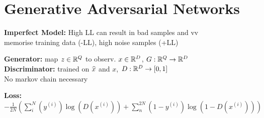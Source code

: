 \section{Generative Adversarial Networks}
\textbf{Imperfect Model:} High LL can result in bad samples and vv\\
memorise training data (-LL), high noise samples (+LL)\\

\textbf{Generator:} map $z \in \mathbb{R}^Q$ to observ. $x \in \mathbb{R}^D$, $G: \mathbb{R}^Q \rightarrow \mathbb{R}^D$\\
\textbf{Discriminator:} trained on $\widehat{x}$ and $x$, $D: \mathbb{R}^D \rightarrow [0,1]$\\
No markov chain necessary\\

\textbf{Loss:}$-\frac{1}{2N}(\sum_i^N (y^{(i)}) \log(D(x^{(i)})) + \sum_n^{2N} (1 - y^{(i)}) \log(1 - D(x^{(i)})))$\\


